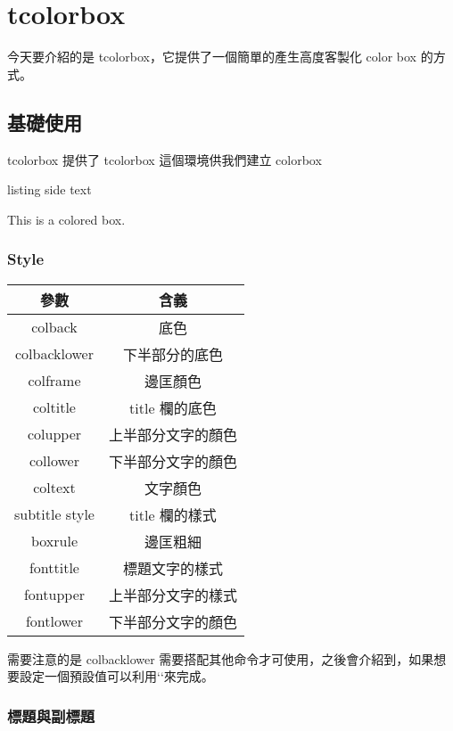 \chapter{tcolorbox}

今天要介紹的是 tcolorbox，它提供了一個簡單的產生高度客製化 color box 的方式。

\section{基礎使用}

tcolorbox 提供了 tcolorbox 這個環境供我們建立 colorbox

\begin{tcblisting}{listing side text}
\begin{tcolorbox}
This is a colored box.
\end{tcolorbox}
\end{tcblisting}

\subsection{Style}

\begin{tabular}{cc}
參數 & 含義 \\\hline\hline
colback & 底色 \\\hline
colbacklower & 下半部分的底色 \\\hline
colframe & 邊匡顏色 \\\hline
coltitle & title 欄的底色 \\\hline
colupper & 上半部分文字的顏色 \\\hline
collower & 下半部分文字的顏色 \\\hline
coltext & 文字顏色 \\\hline 
subtitle style & title 欄的樣式 \\\hline
boxrule & 邊匡粗細 \\\hline
fonttitle & 標題文字的樣式 \\\hline
fontupper & 上半部分文字的樣式 \\\hline
fontlower & 下半部分文字的顏色 \\\hline
\end{tabular}

需要注意的是 colbacklower 需要搭配其他命令才可使用，之後會介紹到，如果想要設定一個預設值可以利用`\tcbset{}`來完成。

\subsection{標題與副標題}

